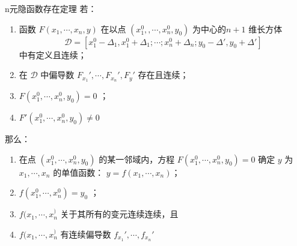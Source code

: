 
\begin{theorem}{n元隐函数存在定理}
若：\begin{enumerate}
\item 函数 $F(x_1,\cdots,x_n,y)$ 在以点 $(x_1^0,,\cdots,x_n^0,y_0)$ 为中心的$n+1$ 维长方体
\begin{equation}
\mathcal{D}=[x_1^0-\Delta_1,x_1^0+\Delta_1;\cdots;x_n^0+\Delta_n;y_0-\Delta',y_0+\Delta']
\end{equation}
中有定义且连续；
\item 在 $\mathcal{D}$ 中偏导数 $F_{x_1}',\cdots,F_{x_n}',F_y'$ 存在且连续；
\item $F(x_1^0,\cdots,x_n^0,y_0)=0$ ；
\item $F'(x_1^0,\cdots,x_n^0,y_0)\neq 0$
\end{enumerate}
那么：
\begin{enumerate}
\item 在点 $(x_1^0,\cdots,x_n^0,y_0)$ 的某一邻域内，方程 $F(x_1^0,\cdots,x_n^0,y_0)=0$ 确定 $y$ 为 $x_1,\cdots,x_n$ 的单值函数： $y=f(x_1,\cdots,x_n)$；
\item $f(x_1^0,\cdots,x_n^0)=y_0$ ；
\item $f(x_1,\cdots,x_n^)$ 关于其所有的变元连续连续，且
\item $f(x_1,\cdots,x_n^)$ 有连续偏导数 $f_{x_1}',\cdots,f_{x_n}'$
\end{enumerate}
\end{theorem}